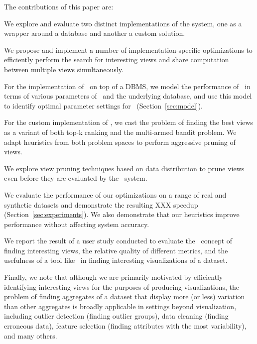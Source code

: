 The contributions of this paper are:
\squishlist
  \item We
  explore and evaluate two distinct implementations of the system, one as a
  wrapper around a database and another a custom solution.
  \item We propose and implement a number of
  implementation-specific optimizations to efficiently perform the
  search for interesting views and share computation between multiple views
  simultaneously. 
  \item For the implementation of \VizRecDB\ on top of a DBMS, we model the
  performance of \VizRecDB\ in terms of various parameters of \VizRecDB\ and the
  underlying database, and use this model to identify optimal parameter settings
  for \VizRecDB\ (Section~\ref{sec:model}).
  \item For the custom implementation of \VizRecDB, we cast the problem of
  finding the best views as a variant of both top-k ranking and the
  multi-armed bandit problem. We adapt heuristics from both problem spaces to
  perform aggressive pruning of views.
  \item We explore view pruning techniques based on data distribution
  to prune views even before they are evaluated by the \VizRecDB\ system.
  \item We evaluate the performance of our optimizations on a range of
  real and synthetic datasets and demonstrate the resulting XXX speedup
  (Section~\ref{sec:experiments}). We also demonstrate that our heuristics
  improve performance without affecting system accuracy.
  \item We report the result of a user study conducted to evaluate the
  \VizRecDB\ concept of finding interesting views, the relative quality of
  different metrics, and the usefulness of a tool like \VizRecDB\ in finding
  interesting visualizations of a dataset.
\squishend

Finally, we note that although we are primarily motivated by efficiently 
identifying interesting views for the purposes of producing visualizations, 
the problem of finding aggregates of a dataset that display more (or less) variation
than other aggregates is broadly applicable in settings beyond visualization, including
outlier detection (finding outlier groups), data cleaning (finding erroneous 
data), feature selection (finding attributes with the most variability), and 
many others.






